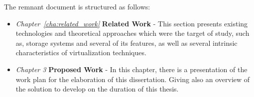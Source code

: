 The remnant document is structured as follows: 

\begin{itemize}

  \item \textit{Chapter~\ref{cha:related_work}}  \textbf{Related Work} - This section presents existing technologies and theoretical approaches which were the target of study, such as, storage systems and several of its features, as well as several intrinsic characteristics of virtualization techniques.

  \item \textit{Chapter 3} \textbf{Proposed Work} - In this chapter, there is a presentation of the work plan for the elaboration of this dissertation. Giving also an overview of the solution to develop on the duration of this thesis.

\end{itemize}

